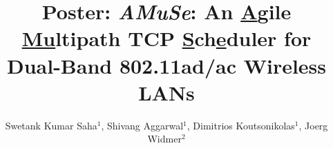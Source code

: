 \documentclass[10pt,sigconf]{acmart}
\begin{document}
\fancyhead{}
\newcommand{\name}{\emph{AMuSe}\xspace}

\title{Poster: \name: An \underline{A}gile \underline{Mu}ltipath TCP \underline{S}ch\underline{e}duler for Dual-Band 802.11ad/ac Wireless LANs}

\author{Swetank Kumar Saha$^1$, Shivang Aggarwal$^1$, Dimitrios Koutsonikolas$^1$, Joerg Widmer$^2$}

\begin{comment}
\author{Lars Th{\o}rv{\"a}ld}
\authornote{This author is the
  one who did all the really hard work.}
\affiliation{%
  \institution{The Th{\o}rv{\"a}ld Group}
  \streetaddress{1 Th{\o}rv{\"a}ld Circle}
  \city{Hekla}
  \country{Iceland}}
\email{larst@affiliation.org}

\author{Valerie B\'eranger}
\affiliation{%
  \institution{Inria Paris-Rocquencourt}
  \city{Rocquencourt}
  \country{France}
}
\author{Aparna Patel}
\affiliation{%
 \institution{Rajiv Gandhi University}
 \streetaddress{Rono-Hills}
 \city{Doimukh}
 \state{Arunachal Pradesh}
 \country{India}}
\author{Huifen Chan}
\affiliation{%
  \institution{Tsinghua University}
  \streetaddress{30 Shuangqing Rd}
  \city{Haidian Qu}
  \state{Beijing Shi}
  \country{China}
}

\author{Charles Palmer}
\affiliation{%
  \institution{Palmer Research Laboratories}
  \streetaddress{8600 Datapoint Drive}
  \city{San Antonio}
  \state{Texas}
  \postcode{78229}}
\email{cpalmer@prl.com}

\author{John Smith}
\affiliation{\institution{The Th{\o}rv{\"a}ld Group}}
\email{jsmith@affiliation.org}

\author{Julius P.~Kumquat}
\affiliation{\institution{The Kumquat Consortium}}
\email{jpkumquat@consortium.net}
\end{comment}

\renewcommand{\shortauthors}{B. Trovato et al.}
\end{document}
